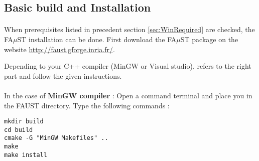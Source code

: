 \subsection{Basic build and Installation}\label{sec:WinBasicInstall}
\paragraph{}When prerequisites listed in precedent section \ref{sec:WinRequired} are checked, the FA$\mu$ST installation can be done. 
First download the FA$\mu$ST package on the website  \url{http://faust.gforge.inria.fr/}. 

Depending to your C++ compiler (MinGW or Visual studio), refers to the right part and follow the given instructions.

\paragraph{}In the case of \textbf{MinGW compiler} :
Open a command terminal and place you in the FAUST directory. Type the following commands : 
\begin{lstlisting}
mkdir build
cd build
cmake -G "MinGW Makefiles" .. 
make
make install
\end{lstlisting}



